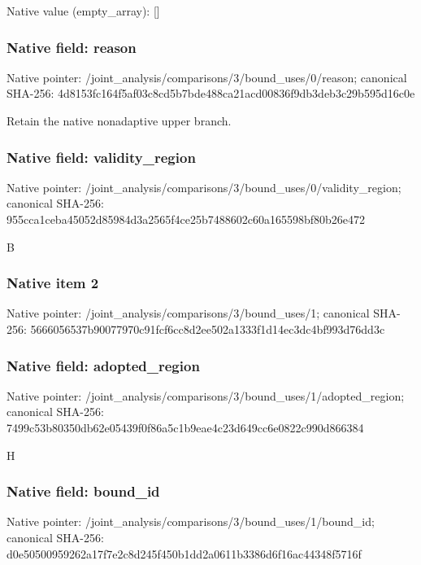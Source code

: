 \documentclass[10pt,a4paper]{article}
\begin{document}
Native value (empty\_\allowbreak{}array): []

\subsubsection{Native field: reason}
Native pointer: /joint\_\allowbreak{}analysis/comparisons/3/bound\_\allowbreak{}uses/0/reason; canonical SHA-256: 4d8153fc164f5af03c8cd5b7bde488ca21acd00836f9db3deb3c29b595d16c0e

\begingroup\raggedright\sloppy Retain the native nonadaptive upper branch.\par\endgroup

\subsubsection{Native field: validity\_\allowbreak{}region}
Native pointer: /joint\_\allowbreak{}analysis/comparisons/3/bound\_\allowbreak{}uses/0/validity\_\allowbreak{}region; canonical SHA-256: 955cca1ceba45052d85984d3a2565f4ce25b7488602c60a165598bf80b26e472

\begingroup\raggedright\sloppy B\par\endgroup

\subsubsection{Native item 2}
Native pointer: /joint\_\allowbreak{}analysis/comparisons/3/bound\_\allowbreak{}uses/1; canonical SHA-256: 5666056537b90077970c91fcf6cc8d2ee502a1333f1d14ec3dc4bf993d76dd3c

\subsubsection{Native field: adopted\_\allowbreak{}region}
Native pointer: /joint\_\allowbreak{}analysis/comparisons/3/bound\_\allowbreak{}uses/1/adopted\_\allowbreak{}region; canonical SHA-256: 7499c53b80350db62e05439f0f86a5c1b9eae4c23d649cc6e0822c990d866384

\begingroup\raggedright\sloppy H\par\endgroup

\subsubsection{Native field: bound\_\allowbreak{}id}
Native pointer: /joint\_\allowbreak{}analysis/comparisons/3/bound\_\allowbreak{}uses/1/bound\_\allowbreak{}id; canonical SHA-256: d0e50500959262a17f7e2c8d245f450b1dd2a0611b3386d6f16ac44348f5716f
\end{document}
